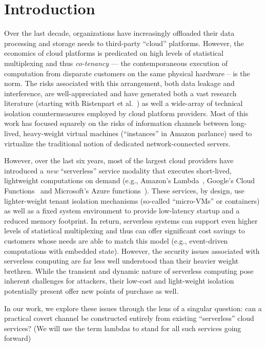 \section{Introduction}
\label{sec:intro}

Over the last decade, organizations have increasingly offloaded their
data processing and storage needs to third-party ``cloud'' platforms.
However, the economics of cloud platforms is predicated on high levels
of statistical multiplexing and thus \emph{co-tenancy} --- the
contemporaneous execution of computation from disparate customers on
the same physical hardware -- is the norm.  The risks associated with
this arrangement, both data leakage and interference, are
well-appreciated and have generated both a vast research literature
(starting with Ristenpart et al.~\cite{ristenpartccs2009}) as well a
wide-array of technical isolation countermeasures employed by cloud
platform providers. Most of this work has focused squarely on the risks
of information channels between long-lived, heavy-weight virtual
machines (``instances'' in Amazon parlance) used to virtualize the
traditional notion of dedicated network-connected servers.

However, over the last six years, most of the largest cloud providers have
introduced a \emph{new} ``serverless'' service modality that executes
short-lived, lightweight computations on demand (e.g., Amazon's
Lambda~\cite{awslambda}, Google's Cloud Functions~\cite{gcpfunctions} and
Microsoft's Azure functions~\cite{azurefunctions}).  These services, by design,
use lighter-weight tenant isolation mechanisms (so-called ``micro-VMs'' or
containers) as well as a fixed system environment to provide low-latency startup
and a reduced memory footprint.  In return, serverless systems can support even
higher levels of statistical multiplexing and thus can offer significant cost
savings to customers whose needs are able to match this model (e.g.,
event-driven computations with embedded state).  However, the security issues
associated with serverless computing are far less well understood than their
heavier weight brethren.  While the transient and dynamic nature of serverless
computing pose inherent challenges for attackers, their low-cost and
light-weight isolation potentially present offer new points of purchase as well.

In our work, we explore these issues through the lens of a singular question:
can a practical covert channel be constructed entirely from existing
``serverless'' cloud services? (We will use the term lambdas to stand for all 
such services going forward)

